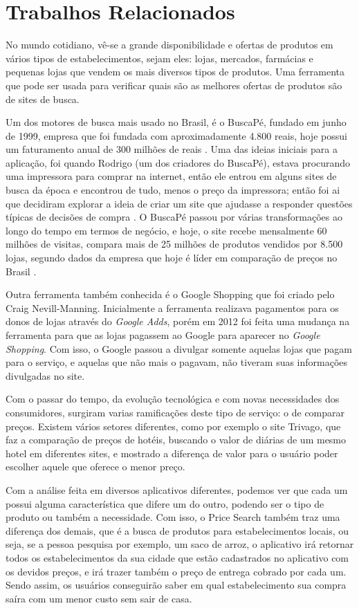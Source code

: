 \section{Trabalhos Relacionados}
No mundo cotidiano, vê-se a grande disponibilidade e ofertas de produtos em vários tipos de estabelecimentos, sejam eles: lojas, mercados, farmácias e pequenas lojas que vendem os mais diversos tipos de produtos. Uma ferramenta que pode ser usada para verificar quais são as melhores ofertas de produtos são de sites de busca.

Um dos motores de busca mais usado no Brasil, é o BuscaPé, fundado em junho de 1999, empresa que foi fundada com aproximadamente 4.800 reais, hoje possui um faturamento anual de 300 milhões de reais \cite{EmídiaFelipe2017BUSCAPÉ}. Uma das ideias iniciais para a aplicação, foi quando Rodrigo (um dos criadores do BuscaPé), estava procurando uma impressora para comprar na internet, então ele entrou em alguns sites de busca da época e encontrou de tudo, menos o preço da impressora; então foi ai que decidiram explorar a ideia de criar um site que ajudasse a responder questões típicas de decisões de compra \cite{Arruda2011BuscaPé}. O BuscaPé passou por várias transformações ao longo do tempo em termos de negócio, e hoje, o site recebe mensalmente 60 milhões de visitas, compara mais de 25 milhões de produtos vendidos por 8.500 lojas, segundo dados da empresa que hoje é líder em comparação de preços no Brasil \cite{HELOÍSA2017Startups}.

Outra ferramenta também conhecida é o Google Shopping que foi criado pelo Craig Nevill-Manning. Inicialmente a ferramenta realizava pagamentos para os donos de lojas através do \textit{Google Adds}, porém em 2012 foi feita uma mudança na ferramenta para que as lojas pagassem ao Google para aparecer no \textit{Google Shopping}. Com isso, o Google passou a divulgar somente aquelas lojas que pagam para o serviço, e aquelas que não mais o pagavam, não tiveram suas informações divulgadas no site.

Com o passar do tempo, da evolução tecnológica e com novas necessidades dos consumidores, surgiram varias ramificações deste tipo de serviço: o de comparar preços. Existem vários setores diferentes, como por exemplo o site Trivago, que faz a comparação de preços de hotéis, buscando o valor de diárias de um mesmo hotel em diferentes sites, e mostrado a diferença de valor para o usuário poder escolher aquele que oferece o menor preço.

Com a análise feita em diversos aplicativos diferentes, podemos ver que cada um possui alguma característica que difere um do outro, podendo ser o tipo de produto ou também a necessidade. Com isso, o Price Search também traz uma diferença dos demais, que é a busca de produtos para estabelecimentos locais, ou seja, se a pessoa pesquisa por exemplo, um saco de arroz, o aplicativo irá retornar todos os estabelecimentos da sua cidade que estão cadastrados no aplicativo com os devidos preços, e irá trazer também o preço de entrega cobrado por cada um. Sendo assim, os usuários conseguirão saber em qual estabelecimento sua compra saíra com um menor custo sem sair de casa.